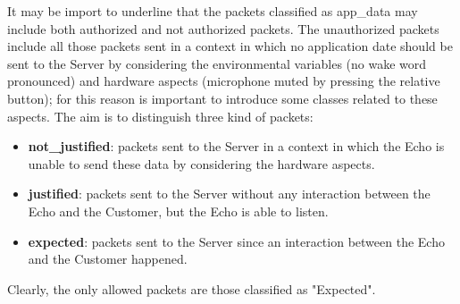 \documentclass[sigconf]{acmart}
\begin{document}
    It may be import to underline that the packets classified as app\_data may include both authorized and not authorized packets.
    The unauthorized packets include all those packets sent in a context in which no application date should be sent to the Server by considering the environmental variables (no wake word pronounced) and hardware aspects (microphone muted by pressing the relative button); for this reason is important to introduce some classes related to these aspects.
    The aim is to distinguish three kind of packets:
    \begin{itemize}
        \item \textbf{not\_justified}: packets sent to the Server in a context in which the Echo is unable to send these data by considering the hardware aspects.
        \item \textbf{justified}: packets sent to the Server without any interaction between the Echo and the Customer, but the Echo is able to listen.
        \item \textbf{expected}: packets sent to the Server since an interaction between the Echo and the Customer happened.
    \end{itemize}
    Clearly, the only allowed packets are those classified as "Expected".
\end{document}
